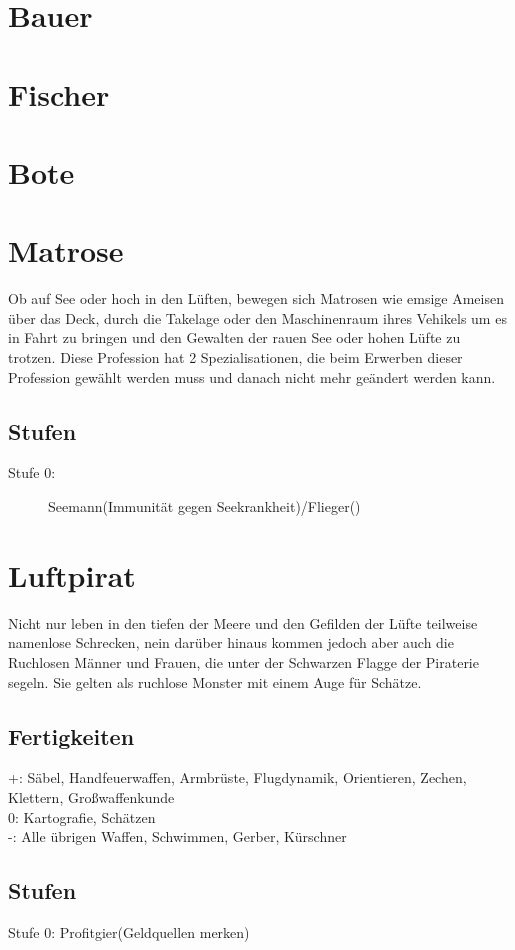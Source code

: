 \documentclass[a4paper,12pt,oneside]{book}
\begin{document}
\section{Bauer}
\section{Fischer}
\section{Bote}
\section{Matrose}
Ob auf See oder hoch in den Lüften, bewegen sich Matrosen wie emsige Ameisen über das Deck, durch die Takelage oder den Maschinenraum ihres Vehikels um es in Fahrt zu bringen und den Gewalten der rauen See oder hohen Lüfte zu trotzen. Diese Profession hat 2 Spezialisationen, die beim Erwerben dieser Profession gewählt werden muss und danach nicht mehr geändert werden kann.
\subsection{Stufen}
\begin{description}
\item[Stufe 0:]Seemann(Immunität gegen Seekrankheit)/Flieger()
\end{description}
\section{Luftpirat}
Nicht nur leben in den tiefen der Meere und den Gefilden der Lüfte teilweise namenlose Schrecken, nein darüber hinaus kommen jedoch aber auch die Ruchlosen Männer und Frauen, die unter der Schwarzen Flagge der Piraterie segeln. Sie gelten als ruchlose Monster mit einem Auge für Schätze.
\subsection{Fertigkeiten}
+: Säbel, Handfeuerwaffen, Armbrüste, Flugdynamik, Orientieren, Zechen, Klettern, Großwaffenkunde
\\0: Kartografie, Schätzen
\\-: Alle übrigen Waffen, Schwimmen, Gerber, Kürschner
\subsection{Stufen}
Stufe 0: Profitgier(Geldquellen merken)
\end{document}
